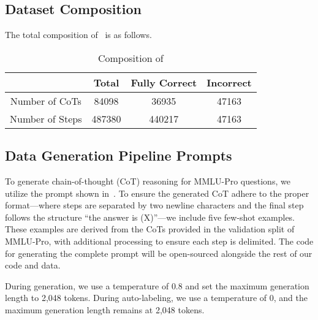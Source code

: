 \subsection{Dataset Composition}
The total composition of \ourdatatrain~is as follows.

\begin{table}[ht]
    \centering
    \caption{Composition of \textit{\ourdatatrain}}
    \small
    \begin{tabular}{cccc} \toprule
          & \textbf{Total} & \textbf{Fully Correct} & \textbf{Incorrect}   \\ \midrule
         Number of CoTs & 84098 & 36935 & 47163 \\
         Number of Steps & 487380 & 440217 & 47163\\
         \bottomrule
    \end{tabular} 
    \label{tab:dataset_composition}
\end{table}


\subsection{Data Generation Pipeline Prompts}
\label{sec:synth-gen-prompts}


To generate chain-of-thought (CoT) reasoning for MMLU-Pro questions, we utilize the prompt shown in~.
To ensure the generated CoT adhere to the proper format---where steps are separated by two newline characters and the final step follows the structure ``the answer is (X)''---we include five few-shot examples. These examples are derived from the CoTs provided in the validation split of MMLU-Pro, with additional processing to ensure each step is delimited. The code for generating the complete prompt will be open-sourced alongside the rest of our code and data.


During generation, we use a temperature of $0.8$ and set the maximum generation length to 2,048 tokens. During auto-labeling, we use a temperature of 0, and the maximum generation length remains at 2,048 tokens.

